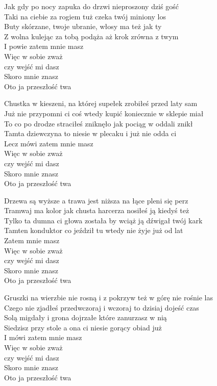 \begin{text}
    \begin{tinyTwo}
	\hfill\break
	\hfill\break
	\hfill\break
	\hfill\break
    Jak gdy po nocy zapuka do drzwi nieproszony dziś gość\\
    Taki na ciebie za rogiem tuż czeka twój miniony los\\
    Buty skórzane, twoje ubranie, włosy ma też jak ty\\
    Z wolna kulejąc za tobą podąża aż krok zrówna z twym\\	
    \vin I powie zatem mnie masz\\
    \vin Więc w sobie zważ\\
	\vin czy wejść mi dasz\\
    \vin Skoro mnie znasz\\
    \vin Oto ja przeszłość twa

    Chustka w kieszeni, na której supełek zrobiłeś przed laty sam\\
    Już nie przypomni ci coś wtedy kupić koniecznie w sklepie miał\\
    To co po drodze straciłeś zniknęło jak pociąg w oddali znikł\\
    Tamta dziewczyna to niesie w plecaku i już nie odda ci\\
    \vin Lecz mówi zatem mnie masz\\
    \vin Więc w sobie zważ\\
	\vin czy wejść mi dasz\\
    \vin Skoro mnie znasz\\
    \vin Oto ja przeszłość twa

    Drzewa są wyższe a trawa jest niższa na łące pleni się perz\\
    Tramwaj ma kolor jak chusta harcerza nosiłeś ją kiedyś też\\
    Tylko ta dumna ci głowa została by wciąż ją dźwigał twój kark\\
    Tamten konduktor co jeździł tu wtedy nie żyje już od lat\\
    \vin Zatem mnie masz\\
    \vin Więc w sobie zważ\\
	\vin czy wejść mi dasz\\
    \vin Skoro mnie znasz\\
    \vin Oto ja przeszłość twa

    Gruszki na wierzbie nie rosną i z pokrzyw też w górę nie rośnie las\\
    Czego nie zjadłeś przedwczoraj i wczoraj to dzisiaj dojeść czas\\
    Solą migdały i grona dojrzałe które zanurzasz w nią\\
    Siedzisz przy stole a ona ci niesie gorący obiad już\\
    \vin I mówi zatem mnie masz\\
    \vin Więc w sobie zważ\\
	\vin czy wejść mi dasz\\
    \vin Skoro mnie znasz\\
    \vin Oto ja przeszłość twa


\end{tinyTwo}
\end{text}
